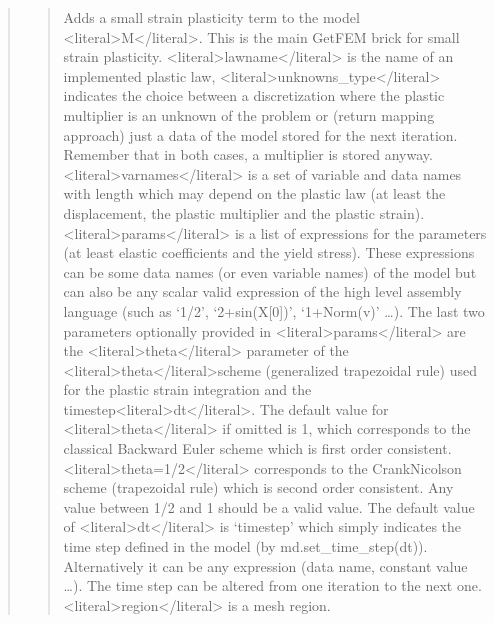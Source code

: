 \documentclass[a4paper,11pt,english]{sphinxmanual}
\begin{document}
\begin{quote}
\begin{quote}
\sphinxAtStartPar
Adds a small strain plasticity term to the model \textless{}literal\textgreater{}M\textless{}/literal\textgreater{}. This is the
main GetFEM brick for small strain plasticity. \textless{}literal\textgreater{}lawname\textless{}/literal\textgreater{} is the name
of an implemented plastic law, \textless{}literal\textgreater{}unknowns\_type\textless{}/literal\textgreater{} indicates the choice
between a discretization where the plastic multiplier is an unknown of
the problem or (return mapping approach) just a data of the model
stored for the next iteration. Remember that in both cases, a multiplier
is stored anyway. \textless{}literal\textgreater{}varnames\textless{}/literal\textgreater{} is a set of variable and data names with
length which may depend on the plastic law (at least the displacement,
the plastic multiplier and the plastic strain). \textless{}literal\textgreater{}params\textless{}/literal\textgreater{} is a list of
expressions for the parameters (at least elastic coefficients and the
yield stress). These expressions can be some data names (or even
variable names) of the model but can also be any scalar valid expression
of the high level assembly language (such as ‘1/2’, ‘2+sin(X{[}0{]})’,
‘1+Norm(v)’ …). The last two parameters optionally provided in
\textless{}literal\textgreater{}params\textless{}/literal\textgreater{} are the \textless{}literal\textgreater{}theta\textless{}/literal\textgreater{} parameter of the \textless{}literal\textgreater{}theta\textless{}/literal\textgreater{}\sphinxhyphen{}scheme (generalized
trapezoidal rule) used for the plastic strain integration and the
time\sphinxhyphen{}step\textless{}literal\textgreater{}dt\textless{}/literal\textgreater{}. The default value for \textless{}literal\textgreater{}theta\textless{}/literal\textgreater{} if omitted is 1, which
corresponds to the classical Backward Euler scheme which is first order
consistent. \textless{}literal\textgreater{}theta=1/2\textless{}/literal\textgreater{} corresponds to the Crank\sphinxhyphen{}Nicolson scheme
(trapezoidal rule) which is second order consistent. Any value
between 1/2 and 1 should be a valid value. The default value of \textless{}literal\textgreater{}dt\textless{}/literal\textgreater{} is
‘timestep’ which simply indicates the time step defined in the model
(by md.set\_time\_step(dt)). Alternatively it can be any expression
(data name, constant value …). The time step can be altered from one
iteration to the next one. \textless{}literal\textgreater{}region\textless{}/literal\textgreater{} is a mesh region.


\end{quote}
\end{quote}
\end{document}
